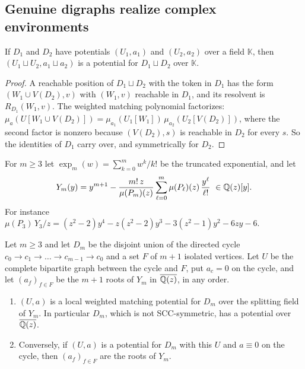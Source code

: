 \subsection{Genuine digraphs realize complex environments}\label{ssec:counterexample}

\begin{lemma}\label{lem:disjoint-union}
If $D_1$ and $D_2$ have potentials $(U_1,a_1)$ and $(U_2,a_2)$ over a field $\mathbb K$, then $(U_1\sqcup U_2,a_1\sqcup a_2)$ is a potential for $D_1\sqcup D_2$ over $\mathbb K$.
\end{lemma}
\begin{proof}
A reachable position of $D_1\sqcup D_2$ with the token in $D_1$ has the form $(W_1\cup V(D_2),v)$ with $(W_1,v)$ reachable in $D_1$, and its resolvent is $R_{D_1}(W_1,v)$. The weighted matching polynomial factorizes: $\mu_a(U[W_1\cup V(D_2)])=\mu_{a_1}(U_1[W_1])\,\mu_{a_2}(U_2[V(D_2)])$, where the second factor is nonzero because $(V(D_2),s)$ is reachable in $D_2$ for every $s$. So the identities of $D_1$ carry over, and symmetrically for $D_2$.
\end{proof}

For $m\ge3$ let $\exp_m(w)=\sum_{k=0}^{m}w^{k}/k!$ be the truncated exponential, and let
\begin{equation}\label{eq:Ym}
Y_m(y)=y^{m+1}-\frac{m!\,z}{\mu(P_m)(z)}\sum_{\ell=0}^{m}\mu(P_\ell)(z)\,\frac{y^{\ell}}{\ell!}\ \in\Qz[y].
\end{equation}
For instance $\mu(P_3)\,Y_3/z=(z^{2}-2)y^{4}-z(z^{2}-2)y^{3}-3(z^{2}-1)y^{2}-6zy-6$.

\begin{theorem}\label{thm:complex-counterexample}
Let $m\ge3$ and let $D_m$ be the disjoint union of the directed cycle $c_0\to c_1\to\dots\to c_{m-1}\to c_0$ and a set $F$ of $m+1$ isolated vertices. Let $U$ be the complete bipartite graph between the cycle and $F$, put $a_{c}=0$ on the cycle, and let $(a_f)_{f\in F}$ be the $m+1$ roots of $Y_m$ in $\overline{\mathbb{Q}(z)}$, in any order.
\begin{enumerate}[label=\textup{(\arabic*)}]
\item $(U,a)$ is a local weighted matching potential for $D_m$ over the splitting field of $Y_m$. In particular $D_m$, which is not SCC-symmetric, has a potential over $\overline{\mathbb{Q}(z)}$.
\item Conversely, if $(U,a)$ is a potential for $D_m$ with this $U$ and $a\equiv0$ on the cycle, then $(a_f)_{f\in F}$ are the roots of $Y_m$.
\end{enumerate}
\end{theorem}

